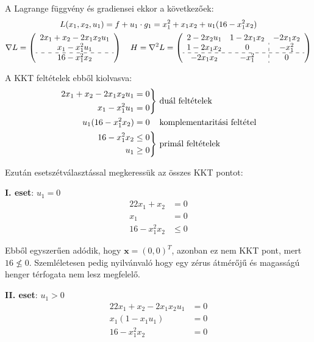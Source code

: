 \begin{megoldas}
A Lagrange függvény és gradiensei ekkor a következőek:
\begin{gather*}
L(x_1,x_2,u_1)=f+u_1\cdot g_1=x_1^2+x_1x_2+u_1(16-x_1^2x_2)\\
\nabla L=\left(\begin{array}{c}2x_1+x_2-2x_1x_2u_1\\x_1-x_1^2u_1\\\hdashline16-x_1^2x_2\end{array}\right)\quad H=\nabla^2L=\left(\begin{array}{cc:c}2-2x_2u_1&1-2x_1x_2&-2x_1x_2\\1-2x_1x_2&0&-x_1^2\\\hdashline-2x_1x_2&-x_1^2&0\end{array}\right)
\end{gather*}

A KKT feltételek ebből kiolvasva:
\begin{alignat*}{2}
\left.\begin{aligned}
        2x_1+x_2-2x_1x_2u_1&=0\\
        x_1-x_1^2u_1&=0
      \end{aligned}
\right\} &\mbox{ duál feltételek}\\
\left.
        u_1(16-x_1^2x_2)=0
\right.\hskip 0.24cm &\mbox{ komplementaritási feltétel}\\
\left.\begin{aligned}
        16-x_1^2x_2&\leq 0\\
        u_1&\geq 0
      \end{aligned}
\right\} &\mbox{ primál feltételek}
\end{alignat*}

Ezután esetszétválasztással megkeressük az összes KKT pontot:

\textbf{I. eset}: $u_1=0$
\begin{alignat*}{2}
2x_1+x_2&=0\\
x_1&=0\\
16-x_1^2x_2&\leq0
\end{alignat*}

Ebből egyszerűen adódik, hogy $\mathbf{x}=(0,0)^T$, azonban ez nem KKT pont, mert $16\not\leq 0$. Szemléletesen pedig nyilvánvaló hogy egy zérus átmérőjű és magasságú henger térfogata nem lesz megfelelő.

\textbf{II. eset}: $u_1>0$
\begin{alignat*}{2}
2x_1+x_2-2x_1x_2u_1&=0\\
x_1(1-x_1u_1)&=0\\
16-x_1^2x_2&=0
\end{alignat*}


\end{megoldas}
